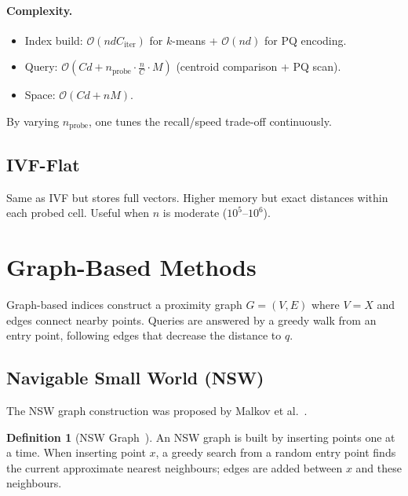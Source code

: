 \documentclass[11pt,a4paper]{article}
\theoremstyle{definition}
\newtheorem{definition}{Definition}[section]
\newcommand{\calO}{\mathcal{O}}
\begin{document}
\paragraph{Complexity.}
\begin{itemize}[nosep]
  \item Index build: $\calO(n d C_{\text{iter}})$ for $k$-means +
    $\calO(nd)$ for PQ encoding.
  \item Query: $\calO(Cd + n_{\text{probe}} \cdot
    \frac{n}{C} \cdot M)$ (centroid comparison + PQ scan).
  \item Space: $\calO(Cd + nM)$.
\end{itemize}

By varying $n_{\text{probe}}$, one tunes the recall/speed trade-off
continuously.

\subsection{IVF-Flat}

Same as IVF but stores full vectors.  Higher memory but exact distances
within each probed cell.  Useful when $n$ is moderate ($10^5$--$10^6$).


\section{Graph-Based Methods}\label{sec:graph}

Graph-based indices construct a proximity graph $G = (V, E)$ where
$V = X$ and edges connect nearby points.  Queries are answered by a
greedy walk from an entry point, following edges that decrease the
distance to $q$.

\subsection{Navigable Small World (NSW)}

The NSW graph construction was proposed by Malkov et al.~\cite{malkov2014nsw}.

\begin{definition}[NSW Graph~\cite{malkov2014nsw}]
An NSW graph is built by inserting points one at a time.  When inserting
point $x$, a greedy search from a random entry point finds the current
approximate nearest neighbours; edges are added between $x$ and these
neighbours.
\end{definition}
\end{document}
